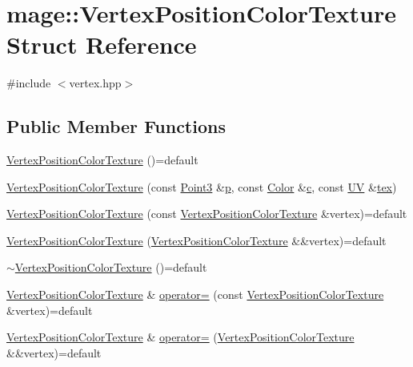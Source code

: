 \hypertarget{structmage_1_1_vertex_position_color_texture}{}\section{mage\+:\+:Vertex\+Position\+Color\+Texture Struct Reference}
\label{structmage_1_1_vertex_position_color_texture}


{\ttfamily \#include $<$vertex.\+hpp$>$}

\subsection*{Public Member Functions}
\begin{DoxyCompactItemize}
\item 
\hyperlink{structmage_1_1_vertex_position_color_texture_a49020fb0c115c3dc3c94471fcbc30a82}{Vertex\+Position\+Color\+Texture} ()=default
\item 
\hyperlink{structmage_1_1_vertex_position_color_texture_a98753386ae479cdc11174136bf8e9412}{Vertex\+Position\+Color\+Texture} (const \hyperlink{structmage_1_1_point3}{Point3} \&\hyperlink{structmage_1_1_vertex_position_color_texture_a145c2e2fce90b07252b778b46e31ea24}{p}, const \hyperlink{structmage_1_1_color}{Color} \&\hyperlink{structmage_1_1_vertex_position_color_texture_afb9ec100ec42e83e501448d4bb0ee4f8}{c}, const \hyperlink{structmage_1_1_u_v}{UV} \&\hyperlink{structmage_1_1_vertex_position_color_texture_adfbaa105e46bb65f502ec33eaa2e8b15}{tex})
\item 
\hyperlink{structmage_1_1_vertex_position_color_texture_a722b0b67f3e8373c1f1935c5cfaa4212}{Vertex\+Position\+Color\+Texture} (const \hyperlink{structmage_1_1_vertex_position_color_texture}{Vertex\+Position\+Color\+Texture} \&vertex)=default
\item 
\hyperlink{structmage_1_1_vertex_position_color_texture_ad3dcf3020023261216437b6315f29261}{Vertex\+Position\+Color\+Texture} (\hyperlink{structmage_1_1_vertex_position_color_texture}{Vertex\+Position\+Color\+Texture} \&\&vertex)=default
\item 
\hyperlink{structmage_1_1_vertex_position_color_texture_a07cc697a88ef1a75ef64aadac9945c11}{$\sim$\+Vertex\+Position\+Color\+Texture} ()=default
\item 
\hyperlink{structmage_1_1_vertex_position_color_texture}{Vertex\+Position\+Color\+Texture} \& \hyperlink{structmage_1_1_vertex_position_color_texture_a6b8d5ebc779ddf9f6e68dc83cb30fe0c}{operator=} (const \hyperlink{structmage_1_1_vertex_position_color_texture}{Vertex\+Position\+Color\+Texture} \&vertex)=default
\item 
\hyperlink{structmage_1_1_vertex_position_color_texture}{Vertex\+Position\+Color\+Texture} \& \hyperlink{structmage_1_1_vertex_position_color_texture_a7f3b2f23f7ed7f4d228f352fb1e53bcd}{operator=} (\hyperlink{structmage_1_1_vertex_position_color_texture}{Vertex\+Position\+Color\+Texture} \&\&vertex)=default
\end{DoxyCompactItemize}
